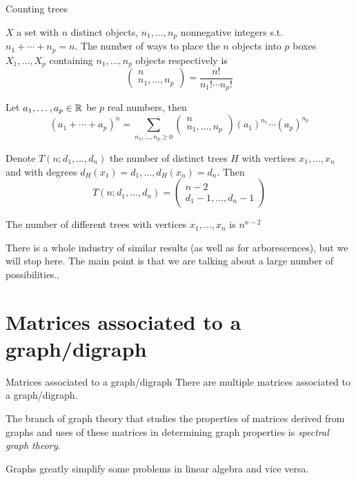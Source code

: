 \documentclass[aspectratio=43]{beamer}
\begin{document}
\begin{frame}{Counting trees}
\begin{proposition}
$X$ a set with $n$ distinct objects, $n_1,\ldots,n_p$ nonnegative integers s.t. $n_1+\cdots+n_p=n$. The number of ways to place the $n$ objects into $p$ boxes $X_1,\ldots,X_p$ containing $n_1,\ldots,n_p$ objects respectively is 
\[
	\begin{pmatrix}
		n\\ n_1,\ldots,n_p
	\end{pmatrix}
	=
	\frac{n!}{n_1!\cdots n_p!}
\]
\end{proposition}
\vfill
\begin{proposition}
Let $a_1,\ldots,a_p\in\mathbb{R}$ be $p$ real numbers, then
\[
	(a_1+\cdots+a_p)^n= 
	\sum_{n_1,\ldots,n_p\geq 0}
	\begin{pmatrix}
		n\\ n_1,\ldots,n_p
	\end{pmatrix}
	(a_1)^{n_1}\cdots(a_p)^{n_p}	
\]
\end{proposition}
\end{frame}


\begin{frame}
\begin{theorem}
Denote $T(n;d_1,\ldots,d_n)$ the number of distinct trees $H$ with vertices $x_1,\ldots,x_n$ and with degrees $d_H(x_1)=d_1,\ldots,d_H(x_n)=d_n$. Then
\[
	T(n;d_1,\ldots,d_n) = 
	\begin{pmatrix}
		n-2 \\
		d_1-1,\ldots,d_n-1
	\end{pmatrix}
\]
\end{theorem}
\vfill
\begin{theorem}
The number of different trees with vertices $x_1,\ldots,x_n$ is 
$n^{n-2}$
\end{theorem}
\vfill
There is a whole industry of similar results (as well as for arborescences), but we will stop here. The main point is that we are talking about a large number of possibilities..
\end{frame}


\section{Matrices associated to a graph/digraph}

\begin{frame}{Matrices associated to a graph/digraph}
	There are multiple matrices associated to a graph/digraph.

	The branch of graph theory that studies the properties of matrices derived from graphs and uses of these matrices in determining graph properties is \emph{spectral graph theory}.
	
	Graphs greatly simplify some problems in linear algebra and vice versa.
\end{frame}
\end{document}
